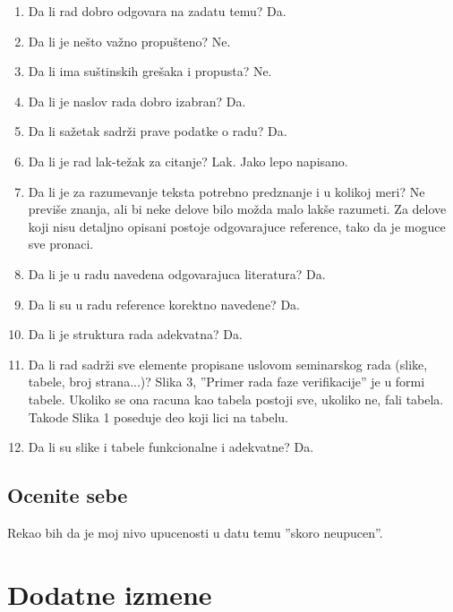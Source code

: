 \documentclass[a4paper]{report}
\begin{document}
\begin{enumerate}
\item Da li rad dobro odgovara na zadatu temu? Da.\\
\item Da li je nešto važno propušteno? Ne.\\
\item Da li ima suštinskih grešaka i propusta? Ne.\\
\item Da li je naslov rada dobro izabran? Da.\\
\item Da li sažetak sadrži prave podatke o radu? Da.\\
\item Da li je rad lak-težak za citanje? Lak. Jako lepo napisano.\\
\item Da li je za razumevanje teksta potrebno predznanje i u kolikoj meri? Ne previše znanja, ali bi neke delove bilo možda malo lakše razumeti. Za delove koji nisu detaljno opisani postoje odgovarajuce reference, tako da je moguce sve pronaci.\\
\item Da li je u radu navedena odgovarajuca literatura? Da.\\
\item Da li su u radu reference korektno navedene? Da.\\
\item Da li je struktura rada adekvatna? Da. \\
\item Da li rad sadrži sve elemente propisane uslovom seminarskog rada (slike, tabele, broj strana...)? Slika 3, ''Primer rada faze verifikacije'' je u formi tabele. Ukoliko se ona racuna kao tabela postoji sve, ukoliko ne, fali tabela. Takode Slika 1 poseduje deo koji lici na tabelu.\\
\item Da li su slike i tabele funkcionalne i adekvatne? Da.\\
\end{enumerate}

\section{Ocenite sebe}
Rekao bih da je moj nivo upucenosti u datu temu ''skoro neupucen''.



\chapter{Dodatne izmene}
\end{document}
